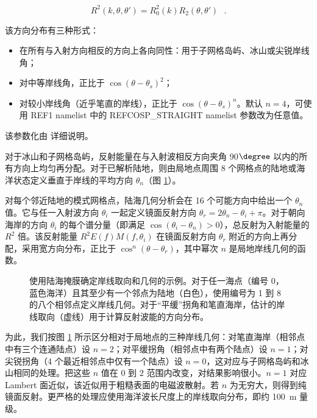 \begin{equation} 
R^2(k,\theta,\theta')  =  R_0^2(k) R_2(\theta,\theta') \:\:\: .
\end{equation}

\noindent
该方向分布有三种形式：
\begin{itemize}

\item 在所有与入射方向相反的方向上各向同性：用于子网格岛屿、冰山或尖锐岸线角；

\item 对中等岸线角，正比于 $\cos(\theta-\theta_s)^2$；

\item 对较小岸线角（近乎笔直的岸线），正比于 $\cos(\theta-\theta_s)^n$。默认 $n=4$，可使用 {\F REF1} namelist 中的 {\code REFCOSP\_STRAIGHT} namelist 参数改为任意值。

\end{itemize}

\noindent
该参数化由 \cite{art:AR12} 详细说明。

对于冰山和子网格岛屿，反射能量在与入射波相反方向夹角 90$\degree$ 以内的所有方向上均匀再分配。对于已解析陆地，则由局地点周围 8 个网格点的陆地或海洋状态定义垂直于岸线的平均方向 $\theta_n$（图 \ref{fig:refl}）。

对每个邻近陆地的模式网格点，陆海几何分析会在 16 个可能方向中给出一个 $\theta_n$ 值。它与任一入射波方向 $\theta_i$ 一起定义镜面反射方向 $\theta_r=2 \theta_n - \theta_i + \pi$。对于朝向海岸的方向 $\theta_i$ 的每个谱分量（即满足 $\cos(\theta_i-\theta_n) >0$），总反射为入射能量的 $R^2$ 倍。该反射能量 $R^2 E(f) M(f,\theta_i)$ 在镜面反射方向 $\theta_r$ 附近的方向上再分配，采用宽方向分布，正比于 $\cos^n(\theta-\theta_r)$，其中幂次 $n$ 是局地岸线几何的函数。

\begin{figure} \begin{center}
\caption{使用陆海掩膜确定岸线取向和几何的示例。对于任一海点（编号 0，蓝色海洋）且其至少有一个邻点为陆地（白色），使用编号为 1 到 8 的八个相邻点定义岸线几何。对于“平缓”拐角和笔直海岸，估计的岸线取向（虚线）用于计算反射波能的方向分布。}
\label{fig:refl} \botline
\end{center}
\end{figure}

为此，我们按图 \ref{fig:refl} 所示区分相对于局地点的三种岸线几何：对笔直海岸（相邻点中有三个连通陆点）设 $n=2$；对平缓拐角（相邻点中有两个陆点）设 $n=1$；对尖锐拐角（4 个最近相邻点中仅有一个陆点）设 $n=0$，这对应与子网格岛屿和冰山相同的处理。把这些 $n$ 值在 $0$ 到 $2$ 范围内改变，对结果影响很小。$n=1$ 对应 Lambert 面近似，该近似用于粗糙表面的电磁波散射。若 $n$ 为无穷大，则得到纯镜面反射。更严格的处理应使用海洋波长尺度上的岸线取向分布，即约 100~m 量级。

